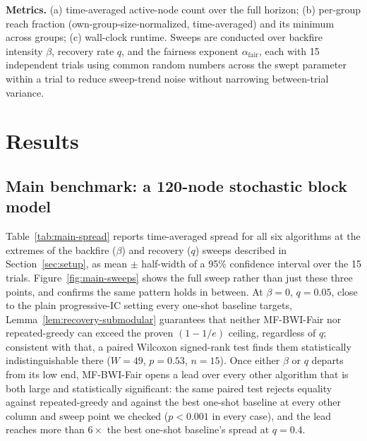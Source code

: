 \documentclass[journal]{IEEEtran}
\begin{document}
\textbf{Metrics.} (a) time-averaged active-node count over the full
horizon; (b) per-group reach fraction (own-group-size-normalized,
time-averaged) and its minimum across groups; (c) wall-clock runtime.
Sweeps are conducted over backfire intensity $\beta$, recovery rate $q$,
and the fairness exponent $\alpha_{\mathrm{fair}}$, each with 15
independent trials using common random numbers across the swept parameter
within a trial to reduce sweep-trend noise without narrowing between-trial
variance.

\section{Results}
\label{sec:results}

\subsection{Main benchmark: a 120-node stochastic block model}
\label{sec:results-main}

Table~\ref{tab:main-spread} reports time-averaged spread for all six
algorithms at the extremes of the backfire ($\beta$) and recovery ($q$)
sweeps described in Section~\ref{sec:setup}, as mean $\pm$ half-width of
a 95\% confidence interval over the 15 trials. Figure~\ref{fig:main-sweeps}
shows the full sweep rather than just these three points, and confirms
the same pattern holds in between. At $\beta=0$, $q=0.05$, close to the
plain progressive-IC setting every one-shot baseline targets,
Lemma~\ref{lem:recovery-submodular} guarantees that neither MF-BWI-Fair
nor repeated-greedy can exceed the proven $(1-1/e)$ ceiling, regardless of
$q$; consistent with that, a paired Wilcoxon signed-rank test finds them
statistically indistinguishable there ($W=49$, $p=0.53$, $n=15$). Once
either $\beta$ or $q$ departs from its low end, MF-BWI-Fair opens a lead
over every other algorithm that is both large and statistically
significant: the same paired test rejects equality against
repeated-greedy and against the best one-shot baseline at every other
column and sweep point we checked ($p<0.001$ in every case), and the
lead reaches more than $6\times$ the best one-shot baseline's spread at
$q=0.4$.
\end{document}
